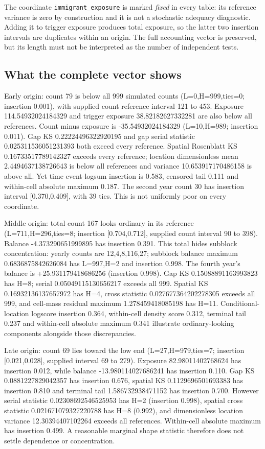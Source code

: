 The coordinate \texttt{immigrant\_exposure} is marked \emph{fixed} in every table: its reference variance is zero by construction and it is not a stochastic adequacy diagnostic. Adding it to trigger exposure produces total exposure, so the latter two insertion intervals are duplicates within an origin. The full accounting vector is preserved, but its length must not be interpreted as the number of independent tests.

\subsection{What the complete vector shows}

Early origin: count 79 is below all 999 simulated counts (L=0,H=999,ties=0; insertion 0.001), with supplied count reference interval 121 to 453. Exposure 114.54932024184329 and trigger exposure 38.82182627332281 are also below all references. Count minus exposure is -35.54932024184329 (L=10,H=989; insertion 0.011). Gap KS 0.22224496322920195 and gap serial statistic 0.025311536051231393 both exceed every reference. Spatial Rosenblatt KS 0.16733517789142327 exceeds every reference; location dimensionless mean 2.4494637138726643 is below all references and variance 10.653917170486158 is above all. Yet time event-logsum insertion is 0.583, censored tail 0.111 and within-cell absolute maximum 0.187. The second year count 30 has insertion interval [0.370,0.409], with 39 ties. This is not uniformly poor on every coordinate.

Middle origin: total count 167 looks ordinary in its reference (L=711,H=296,ties=8; insertion [0.704,0.712], supplied count interval 90 to 398). Balance -4.373290651999895 has insertion 0.391. This total hides subblock concentration: yearly counts are 12,4,8,116,27; subblock balance maximum 0.6836875842626084 has L=997,H=2 and insertion 0.998. The fourth year's balance is +25.931179418686256 (insertion 0.998). Gap KS 0.15088891163993823 has H=8; serial 0.05049115130656217 exceeds all 999. Spatial KS 0.16932136137657972 has H=4, cross statistic 0.027677364202278305 exceeds all 999, and cell-mass residual maximum 1.278459418085198 has H=11. Conditional-location logscore insertion 0.364, within-cell density score 0.312, terminal tail 0.237 and within-cell absolute maximum 0.341 illustrate ordinary-looking components alongside those discrepancies.

Late origin: count 69 lies toward the low end (L=27,H=979,ties=7; insertion [0.021,0.028], supplied interval 69 to 279). Exposure 82.98011402768624 has insertion 0.012, while balance -13.980114027686241 has insertion 0.110. Gap KS 0.0881227829042357 has insertion 0.676, spatial KS 0.1129696501693383 has insertion 0.810 and terminal tail 1.586732938471152 has insertion 0.700. However serial statistic 0.02308692546525953 has H=2 (insertion 0.998), spatial cross statistic 0.021671079327220788 has H=8 (0.992), and dimensionless location variance 12.30394407102264 exceeds all references. Within-cell absolute maximum has insertion 0.499. A reasonable marginal shape statistic therefore does not settle dependence or concentration.

